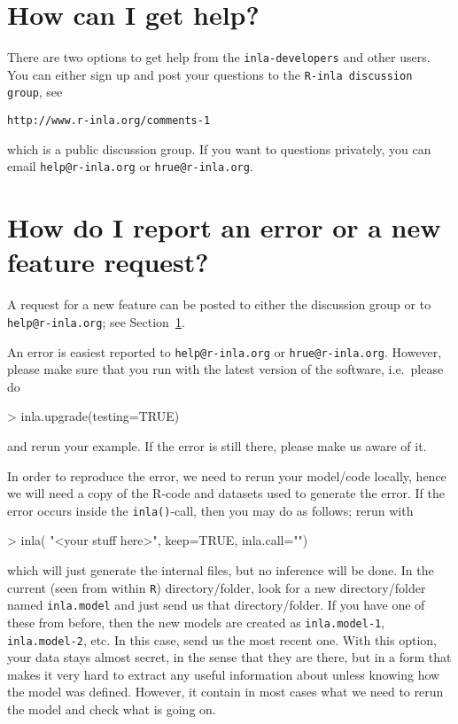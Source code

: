 \documentclass[a4paper,11pt]{report}
\begin{document}
\section{How can I get help?}
\label{sec:gethelp}

There are two options to get help from the \verb|inla-developers| and
other users. You can either sign up and post your questions to the
\verb|R-inla discussion group|, see
\begin{verbatim}
http://www.r-inla.org/comments-1
\end{verbatim}
which is a public discussion group. If you want to questions
privately, you can email \verb|help@r-inla.org| or
\verb|hrue@r-inla.org|.



\section{How do I report an error or a new feature request?}

A request for a new feature can be posted to either the discussion
group or to \verb|help@r-inla.org|; see Section~\ref{sec:gethelp}.

An error is easiest reported to \verb|help@r-inla.org| or
\verb|hrue@r-inla.org|. However, please make sure that you run with
the latest version of the software, i.e.\ please do 
\begin{Schunk}
\begin{Sinput}
> inla.upgrade(testing=TRUE)
\end{Sinput}
\end{Schunk}
and rerun your example. If the error is still there, please make us
aware of it.


In order to reproduce the error, we need to rerun your model/code
locally, hence we will need a copy of the R-code and datasets used to
generate the error. If the error occurs inside the \verb|inla()|-call,
then you may do as follows; rerun with
\begin{Schunk}
\begin{Sinput}
> inla( "<your stuff here>",  keep=TRUE, inla.call="")
\end{Sinput}
\end{Schunk}
which will just generate the internal files, but no inference will be
done.  In the current (seen from within \verb|R|) directory/folder,
look for a new directory/folder named \verb|inla.model| and just send
us that directory/folder. If you have one of these from before, then
the new models are created as \verb|inla.model-1|,
\verb|inla.model-2|, etc. In this case, send us the most recent
one. With this option, your data stays almost secret, in the sense
that they are there, but in a form that makes it very hard to extract
any useful information about unless knowing how the model was
defined. However, it contain in most cases what we need to rerun the
model and check what is going on.
\end{document}
